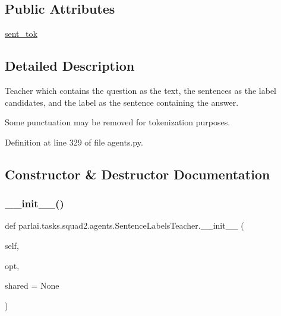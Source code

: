 \subsection*{Public Attributes}
\begin{DoxyCompactItemize}
\item 
\hyperlink{classparlai_1_1tasks_1_1squad2_1_1agents_1_1SentenceLabelsTeacher_a38eaa848e9051e5fb1b0a63f2308481e}{sent\+\_\+tok}
\end{DoxyCompactItemize}


\subsection{Detailed Description}
\begin{DoxyVerb}Teacher which contains the question as the text, the sentences as the label
candidates, and the label as the sentence containing the answer.

Some punctuation may be removed for tokenization purposes.
\end{DoxyVerb}
 

Definition at line 329 of file agents.\+py.



\subsection{Constructor \& Destructor Documentation}
\mbox{\label{classparlai_1_1tasks_1_1squad2_1_1agents_1_1SentenceLabelsTeacher_acc15b4caefa5b72697761981c39873dc}} 
\subsubsection{\texorpdfstring{\+\_\+\+\_\+init\+\_\+\+\_\+()}{\_\_init\_\_()}}
{\footnotesize\ttfamily def parlai.\+tasks.\+squad2.\+agents.\+Sentence\+Labels\+Teacher.\+\_\+\+\_\+init\+\_\+\+\_\+ (\begin{DoxyParamCaption}\item[{}]{self,  }\item[{}]{opt,  }\item[{}]{shared = {\ttfamily None} }\end{DoxyParamCaption})}




